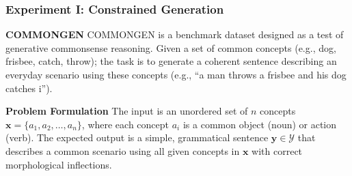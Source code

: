 \documentclass[10pt,aspectratio=43]{beamer}
\begin{document}
    \begin{frame}
        \frametitle{\textbf{Experiment I: Constrained Generation}}
        \begin{block}{\textbf{C{\small OMMON}G{\small EN} }\cite{lin-etal-2020-commongen} }
            C{\small OMMON}G{\small EN} is a benchmark dataset designed as a test of generative commonsense reasoning. Given a set of common concepts (e.g., dog, frisbee, catch, throw); the task is to generate a coherent sentence describing an everyday scenario using these concepts (e.g., ``a man throws a frisbee and his dog catches i'').
        \end{block}
        \begin{block}{\textbf{Problem Formulation}}
            The input is an unordered set of $n$ concepts $\textbf{x} = \{a_1, a_2, \ldots , a_n\}$, where each concept $a_i$ is a common object (noun) or action (verb). The expected output is a simple, grammatical sentence $\textbf{y} \in \mathcal{Y}$ that describes a common scenario  using all given concepts in $\textbf{x}$ with correct morphological inflections. 
        \end{block}
    \end{frame}
    
\end{document}
